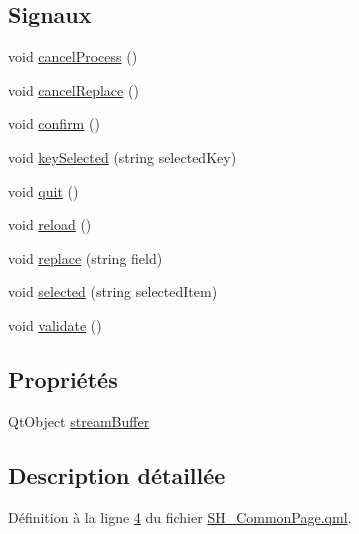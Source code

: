 \subsection*{Signaux}
\begin{DoxyCompactItemize}
\item 
void \hyperlink{classSH__CommonPage_a500427619a33ea991ed173fa0ac3b446}{cancel\-Process} ()
\item 
void \hyperlink{classSH__CommonPage_a5b55fbe80e82ad1a7f06099680ba6595}{cancel\-Replace} ()
\item 
void \hyperlink{classSH__CommonPage_a66387106e42e843b3fd3ffbbcabbb8eb}{confirm} ()
\item 
void \hyperlink{classSH__CommonPage_a073e1151c7ac1c198931d77803d915d3}{key\-Selected} (string selected\-Key)
\item 
void \hyperlink{classSH__CommonPage_a5b15093af63a454ca459407ba1283038}{quit} ()
\item 
void \hyperlink{classSH__CommonPage_a548ff64a01793866cbef6485d1b23f7e}{reload} ()
\item 
void \hyperlink{classSH__CommonPage_a85adde41bfb4344268795d02a27c2e0c}{replace} (string field)
\item 
void \hyperlink{classSH__CommonPage_ab5af66b64fe452dc4e92e97f327ffba5}{selected} (string selected\-Item)
\item 
void \hyperlink{classSH__CommonPage_ad2a5e33acc0a2f0662d342ef44208cca}{validate} ()
\end{DoxyCompactItemize}
\subsection*{Propriétés}
\begin{DoxyCompactItemize}
\item 
Qt\-Object \hyperlink{classSH__CommonPage_af59ae18e73706e3622c000c2005d9550}{stream\-Buffer}
\end{DoxyCompactItemize}


\subsection{Description détaillée}


Définition à la ligne \hyperlink{SH__CommonPage_8qml_source_l00004}{4} du fichier \hyperlink{SH__CommonPage_8qml_source}{S\-H\-\_\-\-Common\-Page.\-qml}.



